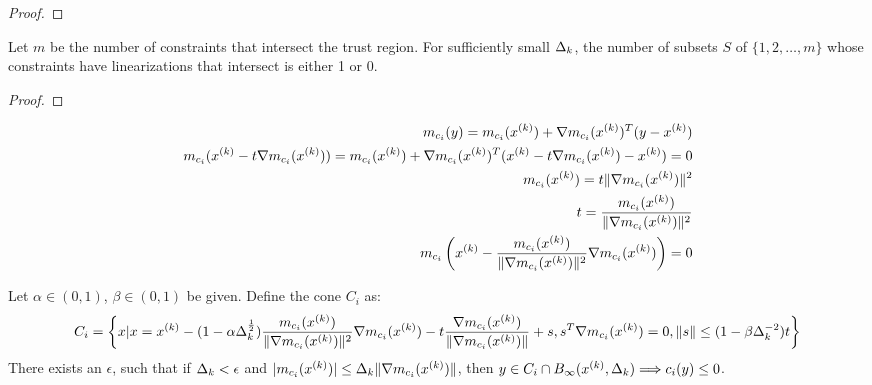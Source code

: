 \begin{proof}

\end{proof}



\begin{theorem}
Let $m$ be the number of constraints that intersect the trust region.
For sufficiently small $\Delta_k$, the number of subsets $S$ of $\{1, 2, \ldots, m\}$
whose constraints have linearizations that intersect is either 1 or 0.
\end{theorem}

\begin{proof}
\end{proof}



\begin{align*}
m_{c_i}(y) = m_{c_i}({x^{(k)}}) + \nabla m_{c_i}({x^{(k)}})^T(y - {x^{(k)}}) \\
m_{c_i}({x^{(k)}} - t \nabla m_{c_i}({x^{(k)}})) = m_{c_i}({x^{(k)}}) + \nabla m_{c_i}({x^{(k)}})^T({x^{(k)}} - t \nabla m_{c_i}({x^{(k)}}) - {x^{(k)}}) = 0 \\
m_{c_i}({x^{(k)}}) = t\|\nabla m_{c_i}({x^{(k)}})\|^2 \\
t = \frac {m_{c_i}({x^{(k)}})}{\|\nabla m_{c_i}({x^{(k)}})\|^2} \\
m_{c_i}\left({x^{(k)}} - \frac {m_{c_i}({x^{(k)}})}{\|\nabla m_{c_i}({x^{(k)}})\|^2} \nabla m_{c_i}({x^{(k)}})\right) = 0
\end{align*}

\begin{theorem}
Let $\alpha \in (0, 1)$, $\beta \in (0, 1)$ be given.
Define the cone $C_i$ as:
\begin{align*}
C_i = \left\{x | x = {x^{(k)}} - (1 - \alpha\Delta_k^{\frac 1 2})\frac {m_{c_i}({x^{(k)}})}{\|\nabla m_{c_i}({x^{(k)}})\|^2} \nabla m_{c_i}({x^{(k)}}) - t\frac{\nabla m_{c_i}({x^{(k)}})}{\|\nabla m_{c_i}({x^{(k)}})\|} + s,s^T\nabla m_{c_i}({x^{(k)}})=0, \|s\| \le (1 - \beta\Delta_k^{-2})t \right\}
\end{align*}
There exists an $\epsilon$, such that if $\Delta_k < \epsilon$ and $|m_{c_i}({x^{(k)}})| \le \Delta_k\|\nabla m_{c_i}({x^{(k)}})\|$,
then $y \in C_i \cap B_{\infty}({x^{(k)}}, \Delta_k) \Longrightarrow c_i(y) \le 0$.
\end{theorem}

